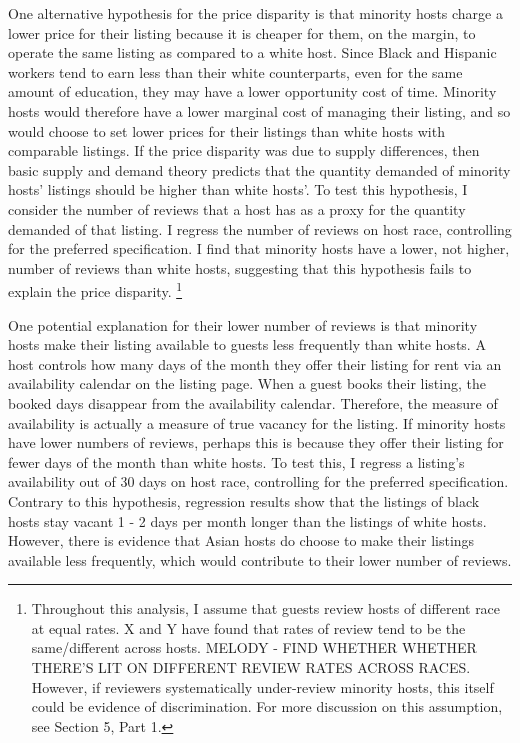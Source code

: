 One alternative hypothesis for the price disparity is that minority hosts charge a lower price for their listing because it is cheaper for them, on the margin, to operate the same listing as compared to a white host. Since Black and Hispanic workers tend to earn less than their white counterparts, even for the same amount of education, they may have a lower opportunity cost of time.\cite{Economic Policy Institute, State of Working America Data Library, ?Wages by education,? 2016.} Minority hosts would therefore have a lower marginal cost of managing their listing, and so would choose to set lower prices for their listings than white hosts with comparable listings. If the price disparity was due to supply differences, then basic supply and demand theory predicts that the quantity demanded of minority hosts' listings should be higher than white hosts'. To test this hypothesis, I consider the number of reviews that a host has as a proxy for the quantity demanded of that listing. I regress the number of reviews on host race, controlling for the preferred specification. I find that minority hosts have a lower, not higher, number of reviews than white hosts, suggesting that this hypothesis fails to explain the price disparity.%
	\footnote{Throughout this analysis, I assume that guests review hosts of different race at equal rates. X and Y have found that rates of review tend to be the same/different across hosts. MELODY - FIND WHETHER WHETHER THERE'S LIT ON DIFFERENT REVIEW RATES ACROSS RACES. However, if reviewers systematically under-review minority hosts, this itself could be evidence of discrimination. For more discussion on this assumption, see Section 5, Part 1.} 

One potential explanation for their lower number of reviews is that minority hosts make their listing available to guests less frequently than white hosts. A host controls how many days of the month they offer their listing for rent via an availability calendar on the listing page. When a guest books their listing, the booked days disappear from the availability calendar. Therefore, the measure of availability is actually a measure of true vacancy for the listing. If minority hosts have lower numbers of reviews, perhaps this is because they offer their listing for fewer days of the month than white hosts. To test this, I regress a listing's availability out of 30 days on host race, controlling for the preferred specification. Contrary to this hypothesis, regression results show that the listings of black hosts stay vacant 1 - 2 days per month longer than the listings of white hosts. However, there is evidence that Asian hosts do choose to make their listings available less frequently, which would contribute to their lower number of reviews. 

